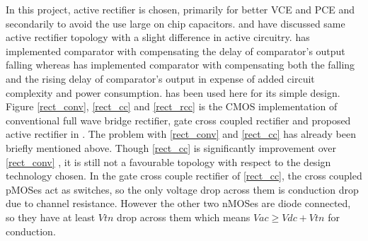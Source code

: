 \documentclass[12pt,a4paper,UKenglish]{article}
\begin{document}
In this project, active rectifier is chosen, primarily for better VCE and PCE and secondarily to avoid the use large on chip capacitors. \cite{rectrcc}  and \cite{rectcomp} have discussed same active rectifier topology with a slight difference in active circuitry. \cite{rectrcc} has implemented comparator with compensating the delay of comparator's output falling whereas \cite{rectcomp} has implemented comparator with compensating both the falling and the rising delay of comparator's output in expense of added circuit complexity and power consumption. \cite{rectrcc} has been used here for its simple design. \\

Figure \ref{rect_conv}, \ref{rect_cc} and \ref{rect_rcc} is the CMOS implementation of conventional full wave bridge rectifier, gate cross coupled rectifier and proposed active rectifier in \cite{rectrcc}. The problem with \ref{rect_conv} and \ref{rect_cc} has already been briefly mentioned above. Though  \ref{rect_cc}  is significantly improvement over  \ref{rect_conv} , it is still not a favourable topology with respect to the design technology chosen. In the gate cross couple rectifier of  \ref{rect_cc}, the cross coupled pMOSes act as switches, so the only voltage drop across them is conduction drop due to channel resistance. However the other two nMOSes are diode connected, so they have at least $Vtn$ drop across them which means $Vac \geq Vdc + Vtn$ for conduction.
\end{document}
